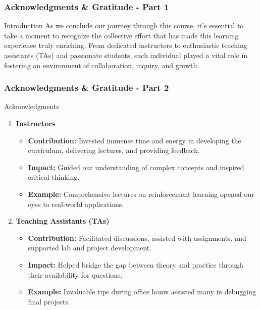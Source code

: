 \documentclass[aspectratio=169]{beamer}
\begin{document}
\begin{frame}[fragile]
    \frametitle{Acknowledgments \& Gratitude - Part 1}
    \begin{block}{Introduction}
        As we conclude our journey through this course, it's essential to take a moment to recognize the collective effort that has made this learning experience truly enriching. 
        From dedicated instructors to enthusiastic teaching assistants (TAs) and passionate students, each individual played a vital role in fostering an environment of collaboration, inquiry, and growth.
    \end{block}
\end{frame}

\begin{frame}[fragile]
    \frametitle{Acknowledgments \& Gratitude - Part 2}
    \begin{block}{Acknowledgments}
        \begin{enumerate}
            \item \textbf{Instructors}
            \begin{itemize}
                \item \textbf{Contribution:} Invested immense time and energy in developing the curriculum, delivering lectures, and providing feedback.
                \item \textbf{Impact:} Guided our understanding of complex concepts and inspired critical thinking.
                \item \textbf{Example:} Comprehensive lectures on reinforcement learning opened our eyes to real-world applications.
            \end{itemize}

            \item \textbf{Teaching Assistants (TAs)}
            \begin{itemize}
                \item \textbf{Contribution:} Facilitated discussions, assisted with assignments, and supported lab and project development.
                \item \textbf{Impact:} Helped bridge the gap between theory and practice through their availability for questions.
                \item \textbf{Example:} Invaluable tips during office hours assisted many in debugging final projects.
            \end{itemize}


\end{enumerate}
\end{block}
\end{frame}
\end{document}
